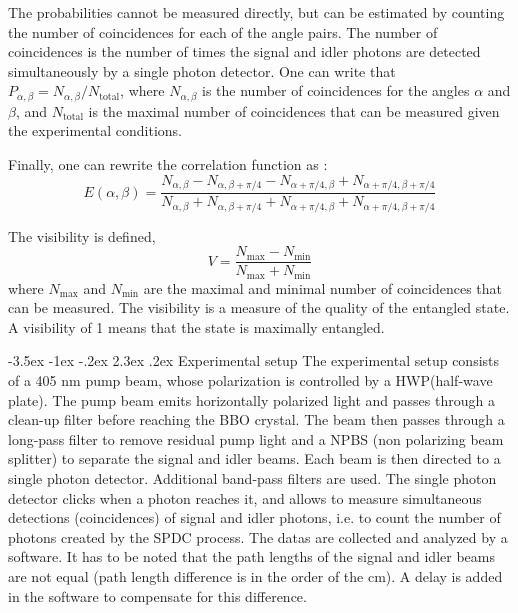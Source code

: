 \documentclass[a4paper, 12pt,oneside]{article}
\makeatletter
\renewcommand{\section}{\@startsection {section}{1}{\z@}%
             {-3.5ex \@plus -1ex \@minus -.2ex}%
             {2.3ex \@plus.2ex}%
             {\normalfont\normalsize\bfseries}}
\makeatother
\begin{document}
The probabilities cannot be measured directly, but can be estimated by counting the number of coincidences for each of the angle pairs. The number of coincidences is the number of times the signal and idler photons are detected simultaneously by a single photon detector. One can write that $P_{\alpha,\beta} = N_{\alpha,\beta}/N_{\text{total}}$, where $N_{\alpha,\beta}$ is the number of coincidences for the angles $\alpha$ and $\beta$, and $N_{\text{total}}$ is the maximal number of coincidences that can be measured given the experimental conditions.

Finally, one can rewrite the correlation function as :
\begin{equation}
    E(\alpha,\beta) = \frac{N_{\alpha,\beta} - N_{\alpha,\beta + \pi/4} - N_{\alpha+ \pi/4,\beta} + N_{\alpha+ \pi/4,\beta+ \pi/4}}{N_{\alpha,\beta} + N_{\alpha,\beta + \pi/4} + N_{\alpha+ \pi/4,\beta} + N_{\alpha+ \pi/4,\beta+ \pi/4}}
    \label{CHSH2}
\end{equation}

The visibility is defined,
\begin{equation}
    V = \frac{N_{\text{max}} - N_{\text{min}}}{N_{\text{max}} + N_{\text{min}}}
\end{equation}
where $N_{\text{max}}$ and $N_{\text{min}}$ are the maximal and minimal number of coincidences that can be measured. The visibility is a measure of the quality of the entangled state. A visibility of 1 means that the state is maximally entangled.


\section{Experimental setup}
The experimental setup consists of a 405 nm pump beam, whose polarization is controlled by a HWP(half-wave plate). The pump beam emits horizontally polarized light and passes through a clean-up filter before reaching the BBO crystal. The beam then passes through a long-pass filter to remove residual pump light and a NPBS (non polarizing beam splitter) to separate the signal and idler beams. Each beam is then directed to a single photon detector. Additional band-pass filters are used. The single photon detector clicks when a photon reaches it, and allows to measure simultaneous detections (coincidences) of signal and idler photons, i.e. to count the number of photons created by the SPDC process. The datas are collected and analyzed by a software. It has to be noted that the path lengths of the signal and idler beams are not equal (path length difference is in the order of the cm). A delay is added in the software to compensate for this difference.
\end{document}
